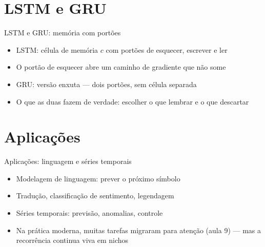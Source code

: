 \documentclass[aspectratio=169, 11pt]{beamer}
\begin{document}
\section{LSTM e GRU}

\begin{frame}{LSTM e GRU: memória com portões}
  \begin{itemize}\setlength{\itemsep}{0.4ex}
    \item LSTM: célula de memória $c$ com portões de esquecer, escrever e ler
    \item O portão de esquecer abre um caminho de gradiente que não some
    \item GRU: versão enxuta — dois portões, sem célula separada
    \item O que as duas fazem de verdade: escolher o que lembrar e o que
          descartar
  \end{itemize}
\end{frame}

\section{Aplicações}

\begin{frame}{Aplicações: linguagem e séries temporais}
  \begin{itemize}\setlength{\itemsep}{0.4ex}
    \item Modelagem de linguagem: prever o próximo símbolo
    \item Tradução, classificação de sentimento, legendagem
    \item Séries temporais: previsão, anomalias, controle
    \item Na prática moderna, muitas tarefas migraram para atenção (aula 9) —
          mas a recorrência continua viva em nichos
  \end{itemize}
\end{frame}
\end{document}

